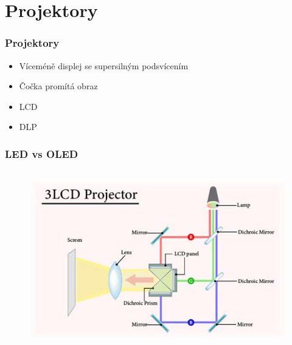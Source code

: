 \documentclass[aspectratio=169,11pt, allowframebreak=0.9]{beamer}
\begin{document}
        \section{Projektory}
        \begin{frame}
            \frametitle{Projektory}
            \begin{itemize}
                \item Víceméně displej se supersilným podsvícením
                \item Čočka promítá obraz
                \item LCD
                \item DLP
            \end{itemize}
            
            \end{frame}
            \begin{frame}
                \frametitle{LED vs OLED}
                \begin{columns}
                \begin{figure}
                    \centering
                    \includegraphics[width=1\textwidth]{lcdp}
                   

\end{figure}
\end{columns}
\end{frame}
\end{document}
